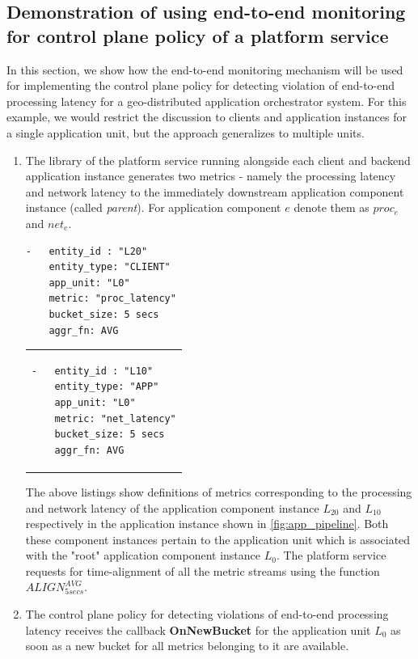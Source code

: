 \subsection{Demonstration of using end-to-end monitoring for control plane policy of a platform service}
In this section, we show how the end-to-end monitoring mechanism will be used for implementing the control plane policy for detecting violation of end-to-end processing latency for a geo-distributed application orchestrator system. For this example, we would restrict the discussion to clients and application instances for a single application unit, but the approach generalizes to multiple units.
\begin{enumerate}
\item The library of the platform service running alongside each client and backend application instance generates two metrics - namely the processing latency and network latency to the immediately downstream application component instance (called \textit{parent}). For application component $e$ denote them as $proc_e$ and $net_e$.\\
\begin{minipage}{0.45\textwidth}
\begin{verbatim}
-   entity_id : "L20"
    entity_type: "CLIENT"
    app_unit: "L0"
    metric: "proc_latency"
    bucket_size: 5 secs
    aggr_fn: AVG
\end{verbatim}
\end{minipage}%
\hfill
\begin{minipage}{0.45\textwidth}
\begin{tabular}{p{\textwidth}}
\begin{verbatim}
-   entity_id : "L10"
    entity_type: "APP"
    app_unit: "L0"
    metric: "net_latency"
    bucket_size: 5 secs
    aggr_fn: AVG
\end{verbatim}
\end{tabular}
\end{minipage}

The above listings show definitions of metrics corresponding to the processing and network latency of the application component instance $L_{20}$ and $L_{10}$ respectively in the application instance shown in \cref{fig:app_pipeline}. Both these component instances pertain to the application unit which is associated with the "root" application component instance $L_0$. The platform service requests for time-alignment of all the metric streams using the function $ALIGN^{AVG}_{5secs}$. 
\item The control plane policy for detecting violations of end-to-end processing latency receives the callback \textbf{OnNewBucket} for the application unit $L_0$ as soon as a new bucket for all metrics belonging to it are available. 


\end{enumerate}
